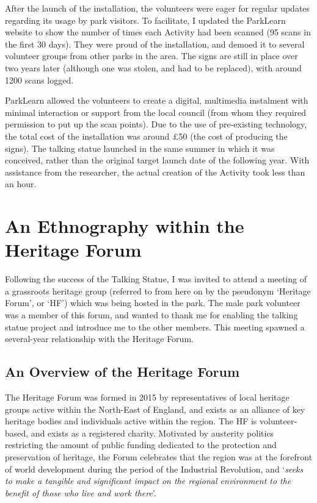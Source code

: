 After the launch of the installation, the volunteers were eager for regular updates regarding its usage by park visitors. To facilitate, I updated the ParkLearn website to show the number of times each Activity had been scanned (95 scans in the first 30 days). They were proud of the installation, and demoed it to several volunteer groups from other parks in the area. The signs are still in place over two years later (although one was stolen, and had to be replaced), with around 1200 scans logged.

ParkLearn allowed the volunteers to create a digital, multimedia instalment with minimal interaction or support from the local council (from whom they required permission to put up the scan points). Due to the use of pre-existing technology, the total cost of the installation was around £50 (the cost of producing the signs). The talking statue launched in the same summer in which it was conceived, rather than the original target launch date of the following year. With assistance from the researcher, the actual creation of the Activity took less than an hour.

\section{An Ethnography within the Heritage Forum}

Following the success of the Talking Statue, I was invited to attend a meeting of a grassroots heritage group (referred to from here on by the pseudonym `Heritage Forum', or `HF') which was being hosted in the park. The male park volunteer was a member of this forum, and wanted to thank me for enabling the talking statue project and introduce me to the other members. This meeting spawned a several-year relationship with the Heritage Forum.

\subsection{An Overview of the Heritage Forum}
The Heritage Forum was formed in 2015 by representatives of local heritage groups active within the North-East of England, and exists as an alliance of key heritage bodies and individuals active within the region. The HF is volunteer-based, and exists as a registered charity. Motivated by austerity politics restricting the amount of public funding dedicated to the protection and preservation of heritage, the Forum celebrates that the region was at the forefront of world development during the period of the Industrial Revolution, and `\textit{seeks to make a tangible and significant impact on the regional environment to the benefit of those who live and work there}'.

